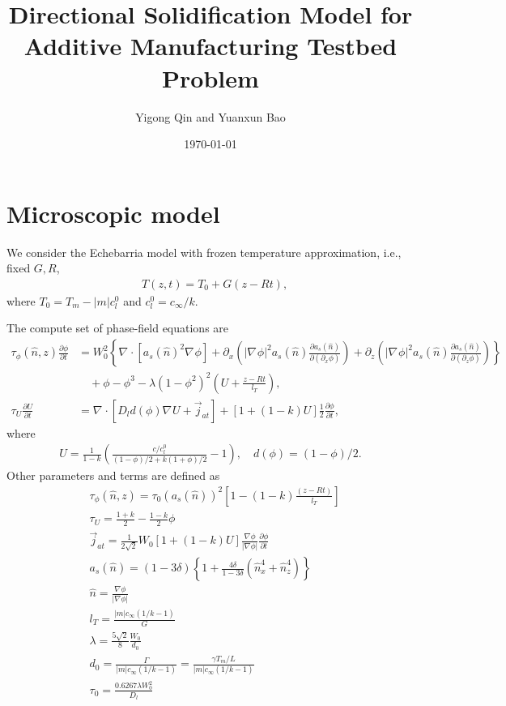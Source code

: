 \documentclass[a4paper,12pt]{article}
\title{Directional Solidification Model for Additive Manufacturing Testbed Problem}
\author{Yigong Qin and Yuanxun Bao}
\date{\today}
\renewcommand{\div}[1]{\nabla_{#1} \cdot}
\newcommand{\grad}[1]{\nabla_{#1}}
\begin{document}
\maketitle




\section{Microscopic model}
We consider the Echebarria model \cite{Tourret2015,Echebarria2010,Plapp2007,Echebarria2004} with frozen temperature approximation, i.e., fixed $G,R$,
\begin{align}
    & T(z,t) = T_0 + G(z-Rt),
\end{align}
where $T_0 = T_m - |m|c_l^0$ and $c_l^0 = c_{\infty}/ k$. 

The compute set of phase-field equations are 
\begin{align}
\tau_{\phi} (\hat{n},z) \frac{\partial \phi}{\partial t} &= W^2_0 \left\{ \div{} [a_s(\hat{n})^2 \grad{} \phi] +  \partial_x \left( |\grad{} \phi|^2 a_s(\hat{n}) \frac{\partial a_s(\hat{n})}{\partial (\partial_x \phi)}  \right)  +
\partial_z \left( |\grad{} \phi|^2 a_s(\hat{n}) \frac{\partial a_s(\hat{n})}{\partial (\partial_z \phi)}  \right)  \right \}  \nonumber \\
& \quad + \phi - \phi^3 - \lambda (1-\phi^2)^2 \left(U + \frac{z-R t}{ l_T} \right),  \label{eq:micro_phi}\\
\tau_U \frac{\partial U}{\partial t} &= \div{} [D_l d(\phi) \grad{} U + \vec{j}_{at}] + [1+(1-k)U]\frac{1}{2}  \frac{\partial \phi}{\partial t}, \label{eq:micro_U}
\end{align}
where 
\begin{align}
U = \frac{1}{1-k} \left( \frac{ c/c_l^0}{(1-\phi)/2 + k(1+\phi)/2} -1\right), \quad d(\phi) = (1-\phi)/2 .
\end{align}
Other parameters and terms are defined as
\begin{align}
    & \tau_{\phi}(\hat{n},z) = \tau_0(a_s(\hat{n}))^2 \left[1-(1-k) \frac{(z-Rt)}{ l_T} \right] \\
	& \tau_U = \frac{1+k}{2} - \frac{1-k}{2}\phi \\
	& \vec{j}_{at} =  \frac{1}{2\sqrt{2}} W_0 [1+(1-k)U] \frac{\nabla \phi}{|\nabla \phi|} \frac{\partial \phi}{\partial t} \\
	& a_{s}(\hat{n}) = (1-3\delta)\left\{1+\frac{4 \delta}{1-3\delta}(\hat{n}_x^4 + \hat{n}_z^4) \right\} \\
    & \hat{n} =  \frac{\nabla \phi}{|\nabla \phi|} \\
    & l_T = \frac{|m|c_{\infty}(1/k-1)}{G} \\
    & \lambda =  \frac{5\sqrt{2}}{8}  \frac{W_0}{d_0} \\
    & d_0 = \frac{\Gamma}{|m|c_{\infty}(1/k-1)} =   \frac{\gamma T_m/L}{|m|c_{\infty}(1/k-1)}  \\
    & \tau_0 =  \frac{0.6267\lambda W_0^2}{D_l}
\end{align}
\end{document}

